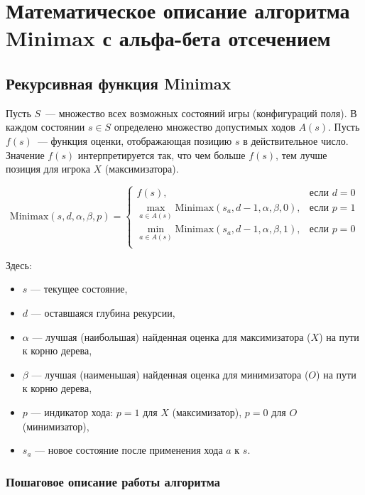 \section{Математическое описание алгоритма Minimax с альфа-бета отсечением}
\subsection{Рекурсивная функция Minimax}

Пусть $S$~— множество всех возможных состояний игры (конфигураций поля).  
В каждом состоянии $s \in S$ определено множество допустимых ходов $A(s)$.  
Пусть $f(s)$~— функция оценки, отображающая позицию $s$ в действительное число. Значение $f(s)$ интерпретируется так, что чем больше $f(s)$, тем лучше позиция для игрока $X$ (максимизатора).

\vspace{1em}


\[
\mathrm{Minimax}(s, d, \alpha, \beta, p) = 
\begin{cases}
f(s), & \text{если } d = 0\\[2ex]
\displaystyle\max\limits_{a \in A(s)} \mathrm{Minimax}(s_a, d-1, \alpha, \beta, 0), & \text{если } p=1 \\[2ex]
\displaystyle\min\limits_{a \in A(s)} \mathrm{Minimax}(s_a, d-1, \alpha, \beta, 1), & \text{если } p=0 \\
\end{cases}
\]

\vspace{1em}

Здесь:
\begin{itemize}
    \item $s$ — текущее состояние,
    \item $d$ — оставшаяся глубина рекурсии,
    \item $\alpha$ — лучшая (наибольшая) найденная оценка для максимизатора ($X$) на пути к корню дерева,
    \item $\beta$ — лучшая (наименьшая) найденная оценка для минимизатора ($O$) на пути к корню дерева,
    \item $p$ — индикатор хода: $p=1$ для $X$ (максимизатор), $p=0$ для $O$ (минимизатор),
    \item $s_a$ — новое состояние после применения хода $a$ к $s$.
\end{itemize}

\vspace{1em}

\subsubsection*{Пошаговое описание работы алгоритма}

